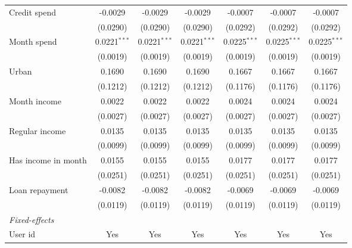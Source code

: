 \begin{table}[htbp]
\begin{threeparttable}[b]
\begin{tabular}{lcccccc}
         Credit spend        & -0.0029        & -0.0029        & -0.0029        & -0.0007        & -0.0007        & -0.0007\\   
                             & (0.0290)       & (0.0290)       & (0.0290)       & (0.0292)       & (0.0292)       & (0.0292)\\   
         Month spend         & 0.0221$^{***}$ & 0.0221$^{***}$ & 0.0221$^{***}$ & 0.0225$^{***}$ & 0.0225$^{***}$ & 0.0225$^{***}$\\   
                             & (0.0019)       & (0.0019)       & (0.0019)       & (0.0019)       & (0.0019)       & (0.0019)\\   
         Urban               & 0.1690         & 0.1690         & 0.1690         & 0.1667         & 0.1667         & 0.1667\\   
                             & (0.1212)       & (0.1212)       & (0.1212)       & (0.1176)       & (0.1176)       & (0.1176)\\   
         Month income        & 0.0022         & 0.0022         & 0.0022         & 0.0024         & 0.0024         & 0.0024\\   
                             & (0.0027)       & (0.0027)       & (0.0027)       & (0.0027)       & (0.0027)       & (0.0027)\\   
         Regular income      & 0.0135         & 0.0135         & 0.0135         & 0.0135         & 0.0135         & 0.0135\\   
                             & (0.0099)       & (0.0099)       & (0.0099)       & (0.0099)       & (0.0099)       & (0.0099)\\   
         Has income in month & 0.0155         & 0.0155         & 0.0155         & 0.0177         & 0.0177         & 0.0177\\   
                             & (0.0251)       & (0.0251)       & (0.0251)       & (0.0251)       & (0.0251)       & (0.0251)\\   
         Loan repayment      & -0.0082        & -0.0082        & -0.0082        & -0.0069        & -0.0069        & -0.0069\\   
                             & (0.0119)       & (0.0119)       & (0.0119)       & (0.0119)       & (0.0119)       & (0.0119)\\   
         \midrule
         \emph{Fixed-effects}\\
         User id             & Yes            & Yes            & Yes            & Yes            & Yes            & Yes\\  

\end{tabular}
\end{threeparttable}
\end{table}
